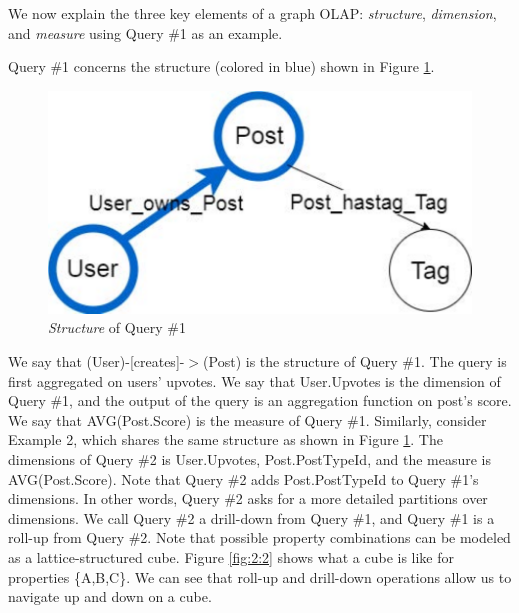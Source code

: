 We now explain the three key elements of a graph OLAP: \textit{structure}, \textit{dimension}, and \textit{measure}  using Query \#1 as an example.


Query \#1 concerns the structure (colored in blue) shown in Figure \ref{fig:2:1}.

\begin{figure}[H]
	\centering
	\includegraphics[scale=0.5]{pic/meta1.pdf}
	\caption{\textit{Structure} of Query \#1}
	\label{fig:2:1}
\end{figure}



We say that (User)-[creates]-$>$(Post) is the structure of Query \#1. The query is first aggregated on users' upvotes. We say that {User.Upvotes} is the dimension of Query \#1, and the output of the query is an aggregation function on post’s score.  We say that {AVG(Post.Score)} is the measure of Query \#1. Similarly, consider Example 2, which shares the same structure as shown in Figure \ref{fig:2:1}. The dimensions of Query \#2 is {User.Upvotes, Post.PostTypeId}, and the measure is {AVG(Post.Score)}. Note that Query \#2 adds Post.PostTypeId to Query \#1’s dimensions. In other words, Query \#2 asks for a more detailed partitions over dimensions. We call Query \#2 a drill-down from Query \#1, and  Query \#1 is a roll-up from Query \#2. Note that possible property combinations can be modeled as a lattice-structured cube. Figure \ref{fig:2:2} shows what a cube is like for properties \{A,B,C\}. We can see that roll-up and drill-down operations allow us to navigate up and down on a cube.


